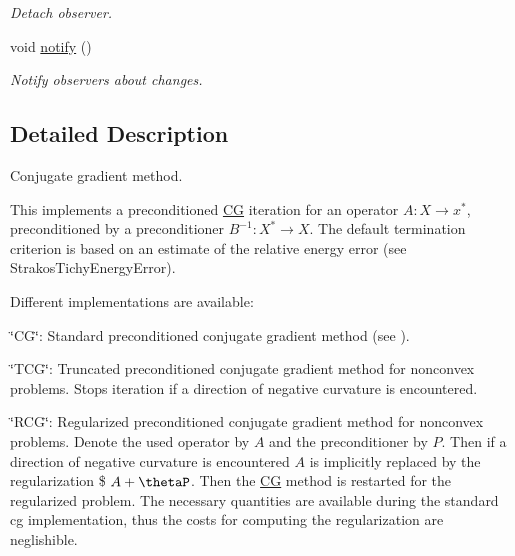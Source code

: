 \begin{DoxyCompactItemize}
\begin{DoxyCompactList}\small\item\em \-Detach observer. \end{DoxyCompactList}\item 
\hypertarget{classSpacy_1_1Mixin_1_1MixinConnection_a1ddeaa78a3bb4a38c2cca36d1f99fe36}{void \hyperlink{classSpacy_1_1Mixin_1_1MixinConnection_a1ddeaa78a3bb4a38c2cca36d1f99fe36}{notify} ()}\label{classSpacy_1_1Mixin_1_1MixinConnection_a1ddeaa78a3bb4a38c2cca36d1f99fe36}

\begin{DoxyCompactList}\small\item\em \-Notify observers about changes. \end{DoxyCompactList}\end{DoxyCompactItemize}


\subsection{\-Detailed \-Description}
\-Conjugate gradient method. 

\-This implements a preconditioned \hyperlink{namespaceSpacy_1_1CG}{\-C\-G} iteration for an operator $ A: X\to x^* $, preconditioned by a preconditioner $ B^{-1}: X^* \to X $. \-The default termination criterion is based on an estimate of the relative energy error (see \-Strakos\-Tichy\-Energy\-Error).

\-Different implementations are available\-:


\begin{DoxyItemize}
\item \char`\"{}\-C\-G\char`\"{}\-: \-Standard preconditioned conjugate gradient method (see \cite{Hestenes1952}).
\end{DoxyItemize}


\begin{DoxyItemize}
\item \char`\"{}\-T\-C\-G\char`\"{}\-: \-Truncated preconditioned conjugate gradient method for nonconvex problems. \-Stops iteration if a direction of negative curvature is encountered.
\end{DoxyItemize}


\begin{DoxyItemize}
\item \char`\"{}\-R\-C\-G\char`\"{}\-: \-Regularized preconditioned conjugate gradient method for nonconvex problems. \-Denote the used operator by $A$ and the preconditioner by $P$. \-Then if a direction of negative curvature is encountered $A$ is implicitly replaced by the regularization \$ $A+\thetaP$. \-Then the \hyperlink{namespaceSpacy_1_1CG}{\-C\-G} method is restarted for the regularized problem. \-The necessary quantities are available during the standard cg implementation, thus the costs for computing the regularization are neglishible.
\end{DoxyItemize}


